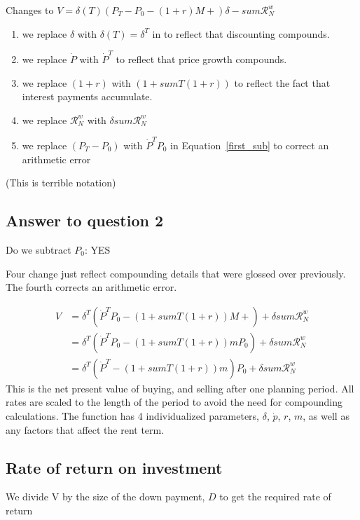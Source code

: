  Changes to $V = \delta(T) \left(P_T -P_0- (1+r)M + \right)  \delta-sum\mathcal{R}^w_N $
 \begin{enumerate}
     \item we replace $\delta$ with $\delta(T) = \delta^T$ in  to reflect that discounting compounds. 
     \item we replace $\dot P$ with $\dot P^T$ to reflect that price growth compounds. 
     \item we replace $(1+r)$ with $(1 + sumT(1+r))$ to reflect the fact that interest payments accumulate.  
     \item we replace $\mathcal{R}^w_N$ with $\delta sum\mathcal{R}^w_N$
     \item we replace $(P_T - P_0)$ with $\dot P^T P_0$ in Equation~\ref{first_sub} to correct an arithmetic error
\end{enumerate} 
(This is terrible notation)
\subsection{Answer to question 2} 
Do we subtract $P_0$: YES 

Four change just reflect compounding details that were glossed over previously. The fourth corrects an arithmetic error.

\begin{align}
V &= \delta^T \left(\dot P^T P_0- (1 + sumT(1+r))M +  \right) +\delta sum\mathcal{R}^w_N   \\
&= \delta^T \left(\dot P^T P_0 - (1 + sumT(1+r))mP_0\right)  +      \delta sum\mathcal{R}^w_N \label{first_sub}\\
  &= \delta^T \left(\dot P^T    - (1 + sumT(1+r))m    \right) P_0 + \delta sum\mathcal{R}^w_N 
\end{align}
This is the net present value of buying, and selling after one planning period. All rates are scaled to the length of the period to avoid the need for compounding calculations. The function has 4 individualized  parameters, $\delta$, $\dot p$, $r$, $m$, as well as any factors that affect the rent term.


\subsection{Rate of return on investment}
We divide V by the size of the down payment, $D$ to get the required rate of return  

